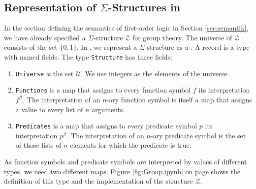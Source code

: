 \subsection{Representation of $\Sigma$-Structures in \texorpdfstring{\Fsharp}{F\#}}
In the section defining  the semantics of first-order logic in Section \ref{sec:semantik}, we
have already specified  a $\Sigma$-structure $\mathcal{Z}$ for group theory.  The universe of $\mathcal{Z}$
consists of the set $\{ 0, 1 \}$.  In \Fsharp, we represent a $\Sigma$-structure as a .  A record
is a type with named fields.  The type \texttt{Structure} has three fields:
\begin{enumerate}
\item \texttt{Universe} is the set $\mathcal{U}$.  We use integers as the elements of the universe.
\item \texttt{Functions} is a map that assigns to every function symbol $f$ its interpretation $f^\mathcal{J}$.
      The interpretation of an $n$-ary function symbol is itself a map that assigns a value to every list of $n$
      arguments.
\item \texttt{Predicates} is a map that assigns to every predicate symbol $p$ its interpretation $p^\mathcal{J}$.
      The interpretation of an $n$-ary predicate symbol is the set of those lists of $n$ elements for which the
      predicate is true.
\end{enumerate}
As function symbols and predicate symbols are interpreted by values of different types, we need two different
maps.  Figure \ref{fig:Group.ipynb} on page \pageref{fig:Group.ipynb} shows the definition of this type and the
implementation of the structure $\mathcal{Z}$.

